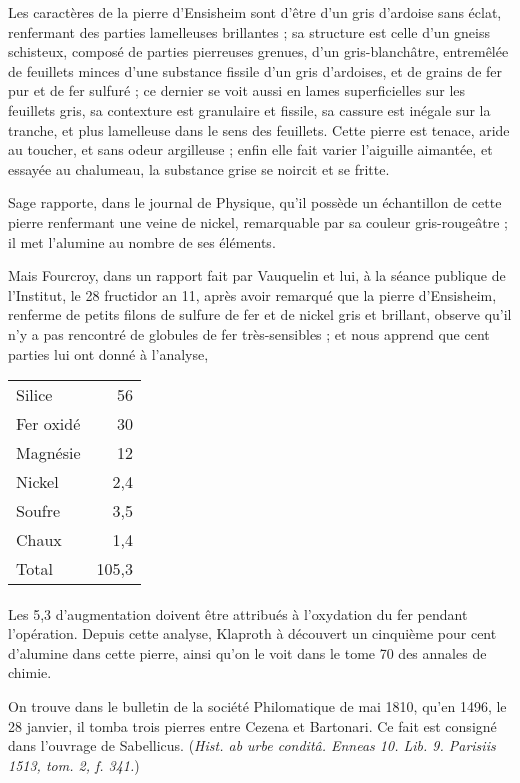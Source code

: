 \documentclass[a4paper, 12pt, oneside, french]{article}
\begin{document}
Les caractères de la pierre d'Ensisheim sont d'être d'un gris d'ardoise sans éclat, renfermant des parties lamelleuses brillantes ; sa structure est celle d'un gneiss schisteux, composé de parties pierreuses grenues, d'un gris-blanchâtre, entremêlée de feuillets minces d'une substance fissile d'un gris d'ardoises, et de grains de fer pur et de fer sulfuré ; ce dernier se voit aussi en lames superficielles sur les feuillets gris, sa contexture est granulaire et fissile, sa cassure est inégale sur la tranche, et plus lamelleuse dans le sens des feuillets. Cette pierre est tenace, aride au toucher, et sans odeur argilleuse ; enfin elle fait varier l'aiguille aimantée, et essayée au chalumeau, la substance grise se noircit et se fritte.

Sage rapporte, dans le journal de Physique, qu'il possède un échantillon de cette pierre renfermant une veine de nickel, remarquable par sa couleur gris-rougeâtre ; il met l'alumine au nombre de ses éléments.

Mais Fourcroy, dans un rapport fait par Vauquelin et lui, à la séance publique de l'Institut, le 28 fructidor an 11, après avoir remarqué que la pierre d'Ensisheim, renferme de petits filons de sulfure de fer et de nickel gris et brillant, observe qu'il n'y a pas rencontré de globules de fer très-sensibles ; et nous apprend que cent parties lui ont donné à l'analyse,
\begin{table}[H]
    \centering
    \begin{tabular}{l r}
        Silice & 56 \\
        Fer oxidé & 30 \\
        Magnésie & 12 \\
        Nickel & 2,4 \\
        Soufre & 3,5 \\
        Chaux & 1,4 \\ \hline
        Total & 105,3 \\
    \end{tabular}
\end{table}
\paragraph{}
Les 5,3 d'augmentation doivent être attribués à l'oxydation du fer pendant l'opération. Depuis cette analyse, Klaproth à découvert un cinquième pour cent d'alumine dans cette pierre, ainsi qu'on le voit dans le tome 70 des annales de chimie.

On trouve dans le bulletin de la société Philomatique de mai 1810, qu'en 1496, le 28 janvier, il tomba trois pierres entre Cezena et Bartonari. Ce fait est consigné dans l'ouvrage de Sabellicus. (\emph{Hist. ab urbe conditâ. Enneas 10. Lib. 9. Parisiis 1513, tom. 2, f. 341.})
\end{document}

